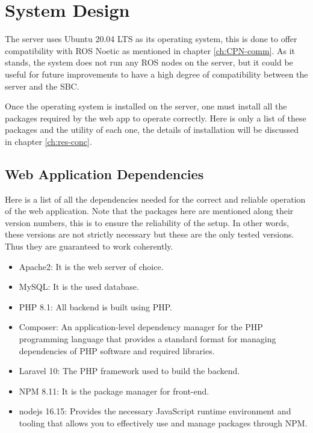 

\section{System Design}
The server uses Ubuntu 20.04 LTS as its operating system, this is done to offer compatibility with ROS Noetic as mentioned in chapter \ref{ch:CPN-comm}. As it stands, the system does not run any ROS nodes on the server, but it could be useful for future improvements to have a high degree of compatibility between the server and the SBC.

Once the operating system is installed on the server, one must install all the packages required by the web app to operate correctly. Here is only a list of these packages and the utility of each one, the details of installation will be discussed in chapter \ref{ch:res-conc}.
\subsection{Web Application Dependencies}
Here is a list of all the dependencies needed for the correct and reliable operation of the web application. Note that the packages here are mentioned along their version numbers, this is to ensure the reliability of the setup. In other words, these versions are not strictly necessary but these are the only tested versions. Thus they are guaranteed to work coherently.

\begin{itemize}
    \item Apache2: It is the web server of choice.
    \item MySQL: It is the used database.
    \item PHP 8.1: All backend is built using PHP.
    \item Composer: An application-level dependency manager for the PHP programming language that provides a standard format for managing dependencies of PHP software and required libraries.
    \item Laravel 10: The PHP framework used to build the backend.
    \item NPM 8.11: It is the package manager for front-end.
    \item nodejs 16.15: Provides the necessary JavaScript runtime environment and tooling that allows you to effectively use and manage packages through NPM.
\end{itemize}

